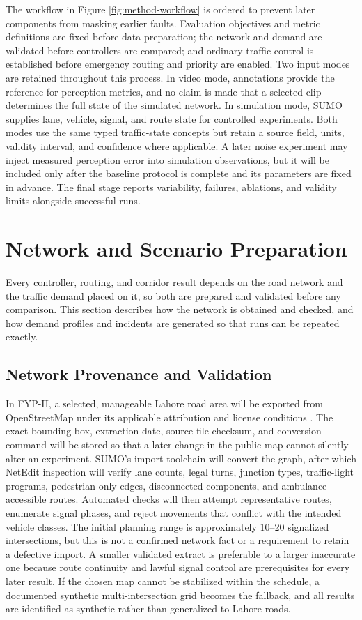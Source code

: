 The workflow in Figure \ref{fig:method-workflow} is ordered to prevent later components from masking earlier faults. Evaluation objectives and metric definitions are fixed before data preparation; the network and demand are validated before controllers are compared; and ordinary traffic control is established before emergency routing and priority are enabled. Two input modes are retained throughout this process. In video mode, annotations provide the reference for perception metrics, and no claim is made that a selected clip determines the full state of the simulated network. In simulation mode, SUMO supplies lane, vehicle, signal, and route state for controlled experiments. Both modes use the same typed traffic-state concepts but retain a source field, units, validity interval, and confidence where applicable. A later noise experiment may inject measured perception error into simulation observations, but it will be included only after the baseline protocol is complete and its parameters are fixed in advance. The final stage reports variability, failures, ablations, and validity limits alongside successful runs.

\section{Network and Scenario Preparation}

Every controller, routing, and corridor result depends on the road network and the traffic demand placed on it, so both are prepared and validated before any comparison. This section describes how the network is obtained and checked, and how demand profiles and incidents are generated so that runs can be repeated exactly.

\subsection{Network Provenance and Validation}

In FYP-II, a selected, manageable Lahore road area will be exported from OpenStreetMap under its applicable attribution and license conditions \cite{osmlicense}. The exact bounding box, extraction date, source file checksum, and conversion command will be stored so that a later change in the public map cannot silently alter an experiment. SUMO's import toolchain will convert the graph, after which NetEdit inspection will verify lane counts, legal turns, junction types, traffic-light programs, pedestrian-only edges, disconnected components, and ambulance-accessible routes. Automated checks will then attempt representative routes, enumerate signal phases, and reject movements that conflict with the intended vehicle classes. The initial planning range is approximately 10--20 signalized intersections, but this is not a confirmed network fact or a requirement to retain a defective import. A smaller validated extract is preferable to a larger inaccurate one because route continuity and lawful signal control are prerequisites for every later result. If the chosen map cannot be stabilized within the schedule, a documented synthetic multi-intersection grid becomes the fallback, and all results are identified as synthetic rather than generalized to Lahore roads.

